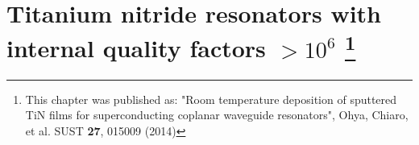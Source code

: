 \chapter[Titanium nitride resonators with internal quality factors $>10^6$]{Titanium nitride resonators with internal quality factors $>10^6$ \footnote{This chapter was published as: "Room temperature deposition of sputtered TiN films for superconducting coplanar waveguide resonators", Ohya, Chiaro, et al. SUST \textbf{27}, 015009 (2014)}}
\label{ch:TiN}


